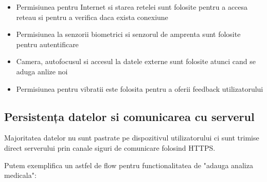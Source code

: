 \documentclass[12pt]{article}
\begin{document}
\begin{itemize}
    \item Permisiunea pentru Internet si starea retelei sunt folosite
    pentru a accesa reteau si pentru a verifica daca exista conexiune
    \item Permisiunea la senzorii biometrici si senzorul de amprenta sunt folosite
    pentru autentificare
    \item Camera, autofocusul si accesul la datele externe sunt folosite atunci cand se aduga anlize noi
    \item Permisiunea pentru vibratii este folosita pentru a oferii feedback utilizatorului
\end{itemize}

\subsection{Persistența datelor si comunicarea cu serverul}

Majoritatea datelor nu sunt pastrate pe dispozitivul utilizatorului ci sunt
trimise direct serverului prin canale siguri de comunicare folosind HTTPS.

Putem exemplifica un astfel de flow pentru functionalitatea de "adauga analiza medicala":
\end{document}
